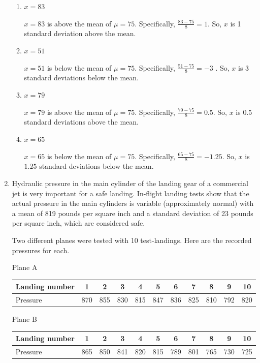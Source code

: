 \documentclass{article}
\newcommand{\answer}[1]{\color{red}#1}
\begin{document}
\begin{enumerate}
	\begin{enumerate}
	\item $x=83$ 
	
	{\answer $x=83$ is above the mean of $\mu = 75$.  Specifically, $\frac{83-75}{8} = 1$.  So, $x$ is 1 standard deviation above the mean.}
	\item $x=51$ 
	
	{\answer $x=51$ is below the mean of $\mu = 75$.  Specifically, $\frac{51-75}{8} = -3$ .  So, $x$ is 3 standard deviations below the mean.}
	\item $x=79$ 
	
	{\answer $x=79$ is above the mean of $\mu = 75$.  Specifically, $\frac{79-75}{8} = 0.5$.  So, $x$ is $0.5$ standard deviations above the mean.}
	\item $x=65$ 
	
	{\answer $x=65$ is below the mean of $\mu = 75$.  Specifically, $\frac{65-75}{8} = -1.25$.  So, $x$ is $1.25$ standard deviations below the mean.}
	\end{enumerate}

\vfill

\item Hydraulic pressure in the main cylinder of the landing gear of a commercial jet is very important for a safe landing.  In-flight landing tests show that the actual pressure in the main cylinders is variable (approximately normal) with a mean of 819 pounds per square inch and a standard deviation of 23 pounds per square inch, which are considered safe.

Two different planes were tested with 10 test-landings.  Here are the recorded pressures for each. 

Plane A 

\begin{tabular}{l|cccccccccc}
\hline 
Landing number  & 1& 2 & 3 & 4 & 5 & 6 & 7 & 8 & 9 & 10 \\
\hline
Pressure & 870 & 855 & 830 & 815 & 847 & 836 & 825 & 810 & 792 & 820 \\
\hline
\end{tabular}

Plane B 

\begin{tabular}{l|cccccccccc}
\hline 
Landing number  & 1& 2 & 3 & 4 & 5 & 6 & 7 & 8 & 9 & 10 \\
\hline
Pressure & 865 & 850 & 841 & 820 & 815 & 789 & 801 & 765 & 730 & 725 \\
\hline
\end{tabular}


\end{enumerate}
\end{document}
